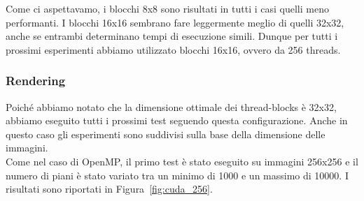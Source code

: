 Come ci aspettavamo, i blocchi 8x8 sono risultati in tutti i casi quelli meno performanti.
I blocchi 16x16 sembrano fare leggermente meglio di quelli 32x32, anche se entrambi determinano tempi di esecuzione simili.
Dunque per tutti i prossimi esperimenti abbiamo utilizzato blocchi 16x16, ovvero da 256 threads.

\subsubsection{Rendering}
Poiché abbiamo notato che la dimensione ottimale dei thread-blocks è 32x32, abbiamo eseguito tutti i prossimi test seguendo questa configurazione.
Anche in questo caso gli esperimenti sono suddivisi sulla base della dimensione delle immagini.\\
Come nel caso di OpenMP, il primo test è stato eseguito su immagini 256x256 e il numero di piani è stato variato tra un minimo di 1000 e un massimo di 10000.
I risultati sono riportati in Figura~\ref{fig:cuda_256}.
